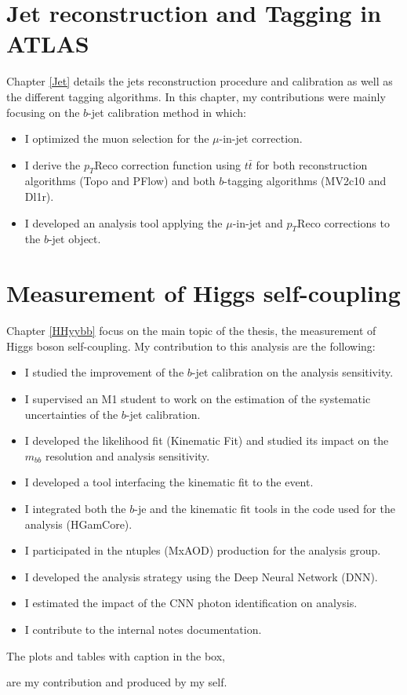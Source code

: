 \section*{Jet reconstruction and Tagging in ATLAS}
Chapter \ref{Jet} details the jets reconstruction procedure and calibration as well as the different tagging algorithms. In this chapter, my contributions were mainly focusing on the $b$-jet calibration method in which: 
\begin{itemize}
    \item I optimized the muon selection for the $\mu$-in-jet correction.
    \item I derive the $p_T$Reco correction function using $t\bar{t}$ for both reconstruction algorithms (Topo and PFlow) and both $b$-tagging algorithms (MV2c10 and Dl1r). 
    \item I developed an analysis tool applying the $\mu$-in-jet and $p_T$Reco corrections to the $b$-jet object.
\end{itemize}

\section*{Measurement of Higgs self-coupling}

Chapter \ref{HHyybb} focus on the main topic of the thesis, the measurement of Higgs boson self-coupling. My contribution to this analysis are the following: 

\begin{itemize}
    \item I studied the improvement of the $b$-jet calibration on the analysis sensitivity.  
    \item I supervised an M1 student to work on the estimation of the systematic uncertainties of the $b$-jet calibration. 
    \item I developed the likelihood fit (Kinematic Fit) and studied its impact on the $m_{bb}$ resolution and analysis sensitivity. 
    \item I developed a tool interfacing the kinematic fit to the \bbyy event.
    \item I integrated both the $b$-je and the kinematic fit tools in the code used for the analysis (HGamCore).
    \item I participated in the ntuples (MxAOD) production for the analysis group.
    \item I developed the analysis strategy using the Deep Neural Network (DNN).
    \item I estimated the impact of the CNN photon identification on \HHyybb analysis.
    \item I contribute to the internal notes documentation.
\end{itemize}

The plots and tables with caption in the box,
\begin{tcolorbox}[colback=black!5!white,colframe=white!75!black]
\end{tcolorbox}
are my contribution and produced by my self.
